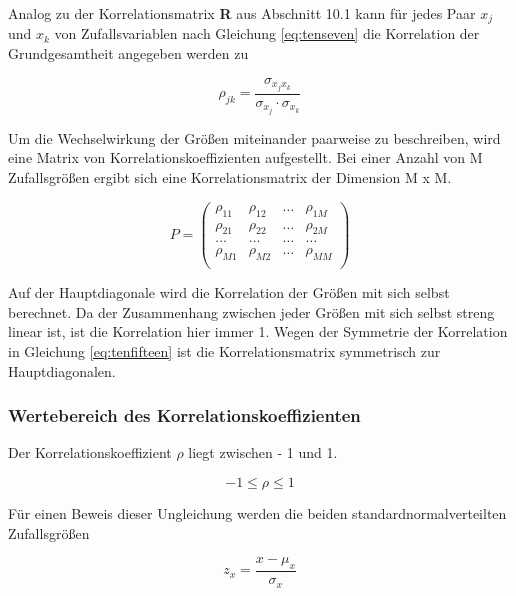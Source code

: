 \noindent Analog zu der Korrelationsmatrix \textbf{R} aus Abschnitt 10.1 kann f\"{u}r jedes Paar $x_{j}$ und $x_{k}$ von Zufallsvariablen nach Gleichung \eqref{eq:tenseven} die Korrelation der Grundgesamtheit angegeben werden zu

\begin{equation}\label{eq:tenfifteen}
\rho _{jk} =\dfrac{\sigma _{x_{j} x_{k}}}{\sigma _{x_{j}} \cdot \sigma _{x_{k}}}
\end{equation}

\noindent Um die Wechselwirkung der Gr\"{o}{\ss}en miteinander paarweise zu beschreiben, wird eine Matrix von Korrelationskoeffizienten aufgestellt. Bei einer Anzahl von M Zufallsgr\"{o}{\ss}en ergibt sich eine Korrelationsmatrix der Dimension M x M.

\begin{equation}\label{eq:tensixteen}
P = 
\begin{pmatrix}
\rho _{11} & \rho _{12} & \dots & \rho _{1M}\\
\rho _{21} & \rho _{22} & \dots & \rho _{2M}\\
\dots & \dots & \dots & \dots\\
\rho _{M1} & \rho _{M2} & \dots & \rho _{MM}\\
\end{pmatrix}
\end{equation}

\noindent  Auf der Hauptdiagonale wird die Korrelation der Gr\"{o}{\ss}en mit sich selbst berechnet. Da der Zusammenhang zwischen jeder Gr\"{o}{\ss}en mit sich selbst streng linear ist, ist die Korrelation hier immer 1. Wegen der Symmetrie der Korrelation in Gleichung \eqref{eq:tenfifteen} ist die Korrelationsmatrix symmetrisch zur Hauptdiagonalen.

\subsubsection{Wertebereich des Korrelationskoeffizienten}

\noindent Der Korrelationskoeffizient $\rho$ liegt zwischen - 1 und 1.

\begin{equation}\label{eq:tenseventeen}
-1\le \rho \le 1
\end{equation}

\noindent F\"{u}r einen Beweis dieser Ungleichung werden die beiden standardnormalverteilten Zufallsgr\"{o}{\ss}en

\begin{equation}\label{eq:teneighteen}
z_{x} =\dfrac{x-\mu _{x}}{\sigma _{x}}
\end{equation}

